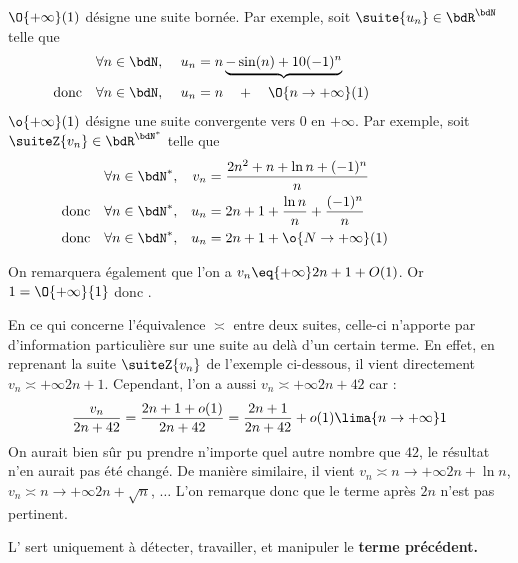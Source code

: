 \documentclass[a4paper,french,bookmarks]{article}
\begin{document}
\begin{example}{}{}
    \begin{enumerate}
        \itarr $\O{+\infty}(1)$ désigne une suite bornée. Par exemple, soit $\suite{u_n} \in \bdR^\bdN$ telle que
        \begin{align*}
            && \forall n \in \bdN, && \ u_n &= n \underbrace{- \sin(n) + 10(-1)^n} && \qquad\qquad\qquad\\
            \text{donc} && \forall n \in \bdN, && \ u_n &= n \ \ \ + \quad \O{n \to +\infty}(1)
        \end{align*}
        \itarr $\o{+\infty}(1)$ désigne une suite convergente vers $0$ en $+\infty$.  Par exemple, soit $\suiteZ{v_n} \in \bdR^{\bdN^*}$ telle que
        \begin{align*}
        && \forall n \in \bdN^*, && v_n &= \dfrac{2n^2 + n + \ln{n} + (-1)^n}{n} && \qquad\qquad\\
        \text{donc} && \forall n \in \bdN^*, && u_n &= 2n +1 + \dfrac{\ln{n}}{n} + \dfrac{(-1)^n}{n}\\
        \text{donc} && \forall n \in \bdN^*, && u_n &= 2n + 1 + \o{N \to +\infty}(1)
        \end{align*}
        
        On remarquera également que l'on a $v_n \eq{+\infty} 2n +1 + O(1)$. Or $1 = \O{+\infty}{1}$ donc .
        
    \end{enumerate}
\end{example}

En ce qui concerne l'équivalence $\asymp$ entre deux suites, celle-ci n'apporte par d'information particulière sur une suite au delà d'un certain terme. En effet, en reprenant la suite $\suiteZ{v_n}$ de l'exemple ci-dessous, il vient directement $v_n \asymp{+\infty} 2n +1$. Cependant, l'on a aussi $v_n \asymp{+\infty} 2n + 42$ car :
\[ \dfrac{v_n}{2n + 42} = \dfrac{2n+1+o(1)}{2n+42} = \dfrac{2n+1}{2n+42} + o(1) \lima{n \to +\infty} 1\]
On aurait bien sûr pu prendre n'importe quel autre nombre que $42$, le résultat n'en aurait pas été changé. De manière similaire, il vient $v_n \asymp{n \to +\infty} 2n + \ln{n}$, $v_n \asymp{n \to +\infty} 2n + \sqrt{n}$, $\dots$ L'on remarque donc que le terme après $2n$ n'est pas pertinent.

\begin{warning}{}{}
    L'  sert uniquement à détecter, travailler, et manipuler le \bf{terme précédent}.
\end{warning}
\end{document}

